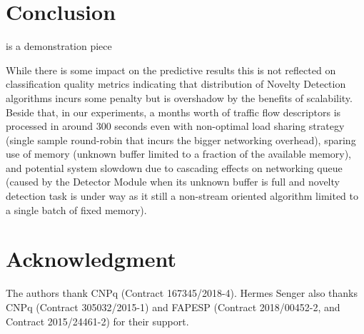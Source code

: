 
\section{Conclusion} 
\label{sec:conclusion}


\mfog is a demonstration piece

While there is some impact on the predictive results this is not reflected on
classification quality metrics indicating that distribution of Novelty Detection
algorithms incurs some penalty but is overshadow by the benefits of scalability.
Beside that, in our experiments, a months worth of traffic flow descriptors is
processed in around $300$ seconds even with non-optimal load sharing strategy
(single sample round-robin that incurs the bigger networking overhead),
sparing use of memory (unknown buffer limited to a fraction of the available memory),
and potential system slowdown due to cascading effects on networking queue
(caused by the Detector Module when its unknown buffer is full and novelty
detection task is under way as it still a non-stream oriented algorithm limited
to a single batch of fixed memory).



\section*{Acknowledgment}

The authors thank CNPq (Contract 167345/2018-4).
Hermes Senger also thanks CNPq (Contract 305032/2015-1) and FAPESP (Contract
2018/00452-2, and Contract 2015/24461-2) for their support.
